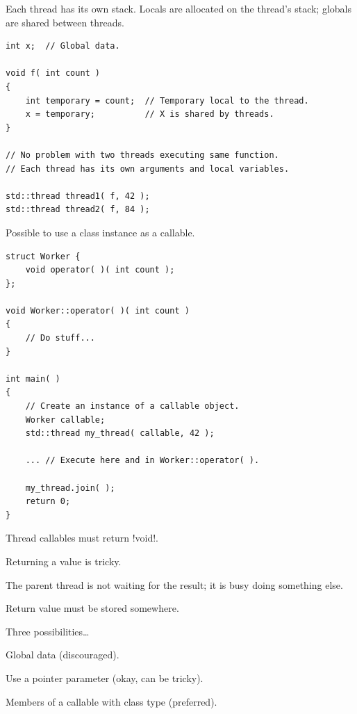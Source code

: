 \documentclass[landscape]{slides}
\begin{document}

Each thread has its own stack. Locals are allocated on the thread's stack; globals are shared
between threads.
\vspace{5mm}
{\small
\begin{lstlisting}
int x;  // Global data.

void f( int count )
{
    int temporary = count;  // Temporary local to the thread.
    x = temporary;          // X is shared by threads.
}

// No problem with two threads executing same function.
// Each thread has its own arguments and local variables.

std::thread thread1( f, 42 );
std::thread thread2( f, 84 );
\end{lstlisting}
}
\stopslide


Possible to use a class instance as a callable.
\vspace{5mm}
{\small
\begin{lstlisting}
struct Worker {
    void operator( )( int count );
};

void Worker::operator( )( int count )
{
    // Do stuff...
}

int main( )
{
    // Create an instance of a callable object.
    Worker callable;
    std::thread my_thread( callable, 42 );

    ... // Execute here and in Worker::operator( ).

    my_thread.join( );
    return 0;
}
\end{lstlisting}
}
\stopslide


\begin{citemize}
  \item Thread callables must return !void!.
  \item Returning a value is tricky.
    \begin{citemize}
      \item The parent thread is not waiting for the result; it is busy doing something else. 
      \item Return value must be stored somewhere.
    \end{citemize}
  \item Three possibilities\ldots
    \begin{citemize}
      \item Global data (discouraged).
      \item Use a pointer parameter (okay, can be tricky).
      \item Members of a callable with class type (preferred).
    \end{citemize}
\end{citemize}
\stopslide
\end{document}

